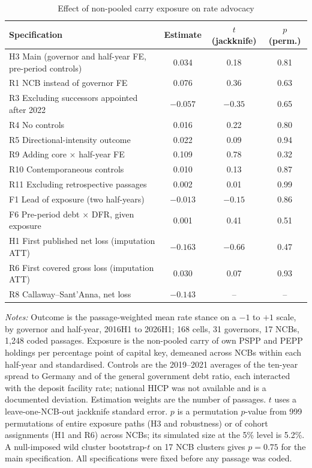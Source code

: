 \documentclass[11pt]{article}
\theoremstyle{plain}
\begin{document}
\begin{table}[t]\centering\small
\begin{threeparttable}
\caption{Effect of non-pooled carry exposure on rate advocacy}\label{tab:main}
\begin{tabular}{lccc}
\toprule
Specification & Estimate & $t$ (jackknife) & $p$ (perm.) \\
\midrule
H3 Main (governor and half-year FE, pre-period controls) & 0.034 & 0.18 & 0.81 \\
R1 NCB instead of governor FE & 0.076 & 0.36 & 0.63 \\
R3 Excluding successors appointed after 2022 & $-0.057$ & $-0.35$ & 0.65 \\
R4 No controls & 0.016 & 0.22 & 0.80 \\
R5 Directional-intensity outcome & 0.022 & 0.09 & 0.94 \\
R9 Adding core $\times$ half-year FE & 0.109 & 0.78 & 0.32 \\
R10 Contemporaneous controls & 0.010 & 0.13 & 0.87 \\
R11 Excluding retrospective passages & 0.002 & 0.01 & 0.99 \\
F1 Lead of exposure (two half-years) & $-0.013$ & $-0.15$ & 0.86 \\
F6 Pre-period debt $\times$ DFR, given exposure & 0.001 & 0.41 & 0.51 \\
\midrule
H1 First published net loss (imputation ATT) & $-0.163$ & $-0.66$ & 0.47 \\
R6 First covered gross loss (imputation ATT) & 0.030 & 0.07 & 0.93 \\
R8 Callaway--Sant'Anna, net loss & $-0.143$ & -- & -- \\
\bottomrule
\end{tabular}
\begin{tablenotes}\footnotesize
\item \textit{Notes:} Outcome is the passage-weighted mean rate stance on a $-1$ to $+1$ scale, by governor and half-year, 2016H1 to 2026H1; 168 cells, 31 governors, 17 NCBs, 1{,}248 coded passages. Exposure is the non-pooled carry of own PSPP and PEPP holdings per percentage point of capital key, demeaned across NCBs within each half-year and standardised. Controls are the 2019--2021 averages of the ten-year spread to Germany and of the general government debt ratio, each interacted with the deposit facility rate; national HICP was not available and is a documented deviation. Estimation weights are the number of passages. $t$ uses a leave-one-NCB-out jackknife standard error. $p$ is a permutation $p$-value from 999 permutations of entire exposure paths (H3 and robustness) or of cohort assignments (H1 and R6) across NCBs; its simulated size at the 5\% level is 5.2\%. A null-imposed wild cluster bootstrap-$t$ on 17 NCB clusters gives $p=0.75$ for the main specification. All specifications were fixed before any passage was coded.
\end{tablenotes}
\end{threeparttable}
\end{table}
\end{document}
